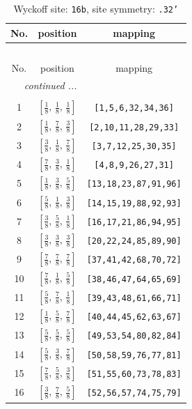 \documentclass[fleqn,8pt]{jsarticle}
\begin{document}
\renewcommand{\arraystretch}{1.2}
\begin{longtable}{ccc}
\caption{Wyckoff site: {\tt 16b}, site symmetry: {\tt .32'}}
 \\
 \hline \hline
No. & position & mapping \\ \hline \endfirsthead

\multicolumn{2}{l}{\tablename\ \thetable{}} \\
 \hline \hline
No. & position & mapping \\ \hline \endhead

 \hline \hline
\multicolumn{2}{r}{\footnotesize\it continued ...} \\ \endfoot

 \hline \hline
\multicolumn{2}{r}{} \\ \endlastfoot

1 & $\left[ \frac{1}{8},\, \frac{1}{8},\, \frac{1}{8} \right]$ & {\tt [1,5,6,32,34,36]} \\ \hline
2 & $\left[ \frac{1}{8},\, \frac{7}{8},\, \frac{3}{8} \right]$ & {\tt [2,10,11,28,29,33]} \\ \hline
3 & $\left[ \frac{3}{8},\, \frac{1}{8},\, \frac{7}{8} \right]$ & {\tt [3,7,12,25,30,35]} \\ \hline
4 & $\left[ \frac{7}{8},\, \frac{3}{8},\, \frac{1}{8} \right]$ & {\tt [4,8,9,26,27,31]} \\ \hline
5 & $\left[ \frac{1}{8},\, \frac{3}{8},\, \frac{5}{8} \right]$ & {\tt [13,18,23,87,91,96]} \\ \hline
6 & $\left[ \frac{5}{8},\, \frac{1}{8},\, \frac{3}{8} \right]$ & {\tt [14,15,19,88,92,93]} \\ \hline
7 & $\left[ \frac{3}{8},\, \frac{5}{8},\, \frac{1}{8} \right]$ & {\tt [16,17,21,86,94,95]} \\ \hline
8 & $\left[ \frac{3}{8},\, \frac{3}{8},\, \frac{3}{8} \right]$ & {\tt [20,22,24,85,89,90]} \\ \hline
9 & $\left[ \frac{7}{8},\, \frac{7}{8},\, \frac{7}{8} \right]$ & {\tt [37,41,42,68,70,72]} \\ \hline
10 & $\left[ \frac{7}{8},\, \frac{1}{8},\, \frac{5}{8} \right]$ & {\tt [38,46,47,64,65,69]} \\ \hline
11 & $\left[ \frac{5}{8},\, \frac{7}{8},\, \frac{1}{8} \right]$ & {\tt [39,43,48,61,66,71]} \\ \hline
12 & $\left[ \frac{1}{8},\, \frac{5}{8},\, \frac{7}{8} \right]$ & {\tt [40,44,45,62,63,67]} \\ \hline
13 & $\left[ \frac{5}{8},\, \frac{5}{8},\, \frac{5}{8} \right]$ & {\tt [49,53,54,80,82,84]} \\ \hline
14 & $\left[ \frac{5}{8},\, \frac{3}{8},\, \frac{7}{8} \right]$ & {\tt [50,58,59,76,77,81]} \\ \hline
15 & $\left[ \frac{7}{8},\, \frac{5}{8},\, \frac{3}{8} \right]$ & {\tt [51,55,60,73,78,83]} \\ \hline
16 & $\left[ \frac{3}{8},\, \frac{7}{8},\, \frac{5}{8} \right]$ & {\tt [52,56,57,74,75,79]} \\
\end{longtable}
\end{document}
